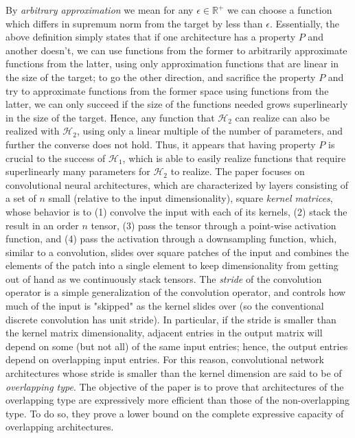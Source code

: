 \documentclass{article}
\begin{document}
\leavevmode \newline
By \textit{arbitrary approximation} we mean for any $ \epsilon \in \mathbb{R}^+ $ we can choose a function which differs in supremum norm from the target by less than $ \epsilon $. Essentially, the above definition simply states that if one architecture has a property $ P $ and another doesn't, we can use functions from the former to arbitrarily approximate functions from the latter, using only approximation functions that are linear in the size of the target; to go the other direction, and sacrifice the property $ P $ and try to approximate functions from the former space using functions from the latter, we can only succeed if the size of the functions needed grows superlinearly in the size of the target. Hence, any function that $ \mathcal{H}_2 $ can realize can also be realized with $ \mathcal{H}_2 $, using only a linear multiple of the number of parameters, and further the converse does not hold. Thus, it appears that having property $ P $ is crucial to the success of $ \mathcal{H}_1 $, which is able to easily realize functions that require superlinearly many parameters for $ \mathcal{H}_2 $ to realize.
\newline \newline
The paper focuses on convolutional neural architectures, which are characterized by layers consisting of a set of $ n $ small (relative to the input dimensionality), square \textit{kernel matrices}, whose behavior is to (1) convolve the input with each of its kernels, (2) stack the result in an order $ n $ tensor, (3) pass the tensor through a point-wise activation function, and (4) pass the activation through a downsampling function, which, similar to a convolution, slides over square patches of the input and combines the elements of the patch into a single element to keep dimensionality from getting out of hand as we continuously stack tensors. The \textit{stride} of the convolution operator is a simple generalization of the convolution operator, and controls how much of the input is "skipped" as the kernel slides over (so the conventional discrete convolution has unit stride). In particular, if the stride is smaller than the kernel matrix dimensionality, adjacent entries in the output matrix will depend on some (but not all) of the same input entries; hence, the output entries depend on overlapping input entries. For this reason, convolutional network architectures whose stride is smaller than the kernel dimension are said to be of \textit{overlapping type}. The objective of the paper is to prove that architectures of the overlapping type are expressively more efficient than those of the non-overlapping type. To do so, they prove a lower bound on the complete expressive capacity of overlapping architectures.
\end{document}
